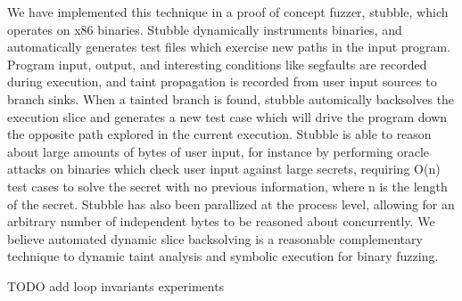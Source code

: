 \documentclass[11pt,expanded,copyright]{fsuthesis}
\begin{document}
We have implemented this technique in a proof of concept fuzzer, stubble, which operates on x86 binaries. Stubble dynamically instruments binaries, and automatically generates test files which exercise new paths in the input program. Program input, output, and interesting conditions like segfaults are recorded during execution, and taint propagation is recorded from user input sources to branch sinks. When a tainted branch is found, stubble automically backsolves the execution slice and generates a new test case which will drive the program down the opposite path explored in the current execution. Stubble is able to reason about large amounts of bytes of user input, for instance by performing oracle attacks on binaries which check user input against large secrets, requiring O(n) test cases to solve the secret with no previous information, where n is the length of the secret. Stubble has also been parallized at the process level, allowing for an arbitrary number of independent bytes to be reasoned about concurrently. We believe automated dynamic slice backsolving is a reasonable complementary technique to dynamic taint analysis and symbolic execution for binary fuzzing.

TODO add loop invariants experiments


 

\end{document}
